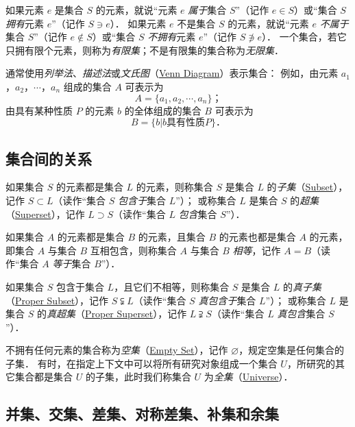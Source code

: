 如果元素 $e$ 是集合 $S$ 的元素，就说``元素 $e$ \emph{属于}集合 $S$''（记作 $e\in{}S$）或``集合 $S$ \emph{拥有}元素 $e$''（记作 $S\ni{}e$）．
如果元素 $e$ 不是集合 $S$ 的元素，就说``元素 $e$ \emph{不属于}集合 $S$''（记作 $e\not\in{}S$）或``集合 $S$ \emph{不拥有}元素 $e$''（记作 $S\not\ni{}e$）．
一个集合，若它只拥有限个元素，则称为\emph{有限集}；不是有限集的集合称为\emph{无限集}．

通常使用\emph{列举法}、\emph{描述法}或\emph{文氏图}（\href{http://mathworld.wolfram.com/VennDiagram.html}{Venn Diagram}）表示集合：
例如，由元素 $a_1$，$a_2$，$\cdots$，$a_n$ 组成的集合 $A$ 可表示为
\[
A = \{ a_1, a_2, \cdots, a_n \} \text{；}
\]
由具有某种性质 $P$ 的元素 $b$ 的全体组成的集合 $B$ 可表示为
\[
B = \{ b | b \text{具有性质} P \} \text{．}
\]

\subsection{集合间的关系}

如果集合 $S$ 的元素都是集合 $L$ 的元素，则称集合 $S$ 是集合 $L$ 的\emph{子集}（\href{http://mathworld.wolfram.com/Subset.html}{Subset}），记作 $S\subset{}L$（读作``集合 $S$ \emph{包含于}集合 $L$''）；
或称集合 $L$ 是集合 $S$ 的\emph{超集}（\href{http://mathworld.wolfram.com/Superset.html}{Superset}），记作 $L\supset{}S$（读作``集合 $L$ \emph{包含}集合 $S$''）．

如果集合 $A$ 的元素都是集合 $B$ 的元素，且集合 $B$ 的元素也都是集合 $A$ 的元素，即集合 $A$ 与集合 $B$ 互相包含，则称集合 $A$ 与集合 $B$ \emph{相等}，记作 $A=B$（读作``集合 $A$ \emph{等于}集合 $B$''）．

如果集合 $S$ 包含于集合 $L$，且它们不相等，则称集合 $S$ 是集合 $L$ 的\emph{真子集}（\href{http://mathworld.wolfram.com/ProperSubset.html}{Proper Subset}），记作 $S\subsetneqq{}L$（读作``集合 $S$ \emph{真包含于}集合 $L$''）；
或称集合 $L$ 是集合 $S$ 的\emph{真超集}（\href{http://mathworld.wolfram.com/ProperSuperset.html}{Proper Superset}），记作 $L\supsetneqq{}S$（读作``集合 $L$ \emph{真包含}集合 $S$''）．

不拥有任何元素的集合称为\emph{空集}（\href{http://mathworld.wolfram.com/EmptySet.html}{Empty Set}），记作 $\varnothing$，规定空集是任何集合的子集．
有时，在指定上下文中可以将所有研究对象组成一个集合 $U$，所研究的其它集合都是集合 $U$ 的子集，此时我们称集合 $U$ 为\emph{全集}（\href{http://mathworld.wolfram.com/UniversalSet.html}{Universe}）．

\subsection{并集、交集、差集、对称差集、补集和余集}

